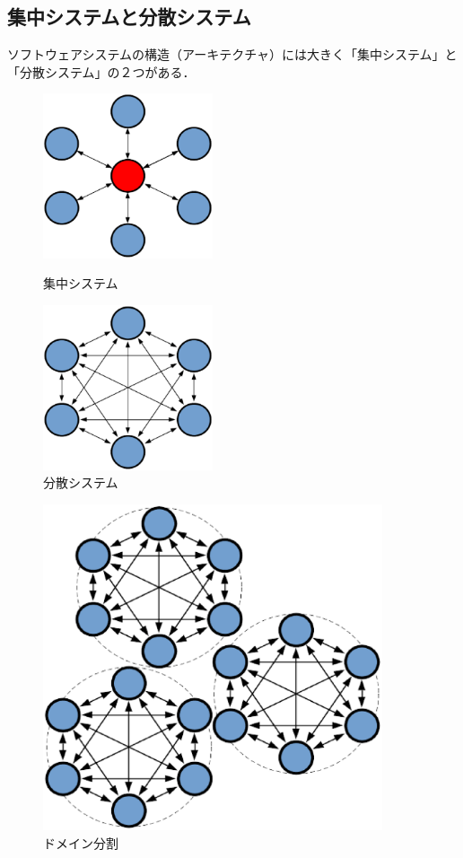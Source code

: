 \documentclass[a4paper,12pt]{jsarticle}
\begin{document}
      \subsection*{集中システムと分散システム}%
ソフトウェアシステムの構造（アーキテクチャ）には大きく「集中システム」と「分散システム」の２つがある．
\begin{figure}[h]%
  \begin{minipage}{0.5\columnwidth}
    \centering
    \includegraphics[width=50mm]{pht/CentralizedSystem.eps}
    \caption{集中システム}
    \label{fig:CentralizedSystem}
  \end{minipage}
  \begin{minipage}{0.5\columnwidth}
    \centering
    \includegraphics[width=50mm]{pht/DistributedSystem.eps}
    \caption{分散システム}
    \label{fig:DistributedSystem}
  \end{minipage}
\end{figure}

\begin{figure}[h]%
  \begin{center}
    \includegraphics[width=100mm]{pht/DomainSplit.eps}
  \end{center}
  \caption{ドメイン分割}
  \label{fig:DomainSplit}
\end{figure}
\end{document}
